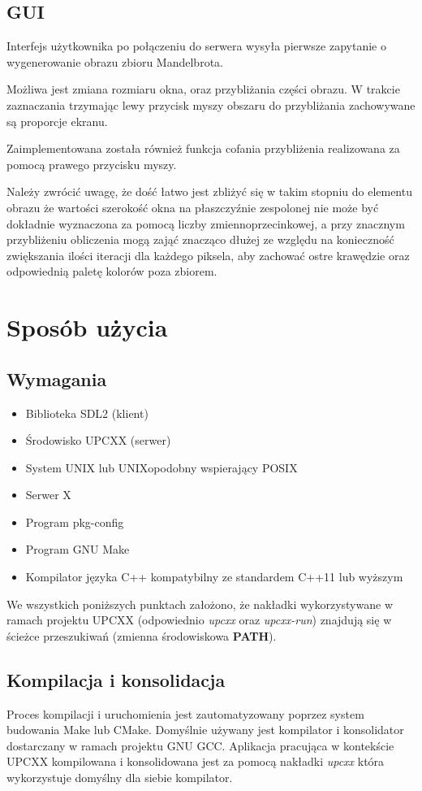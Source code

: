 \subsection{GUI}
Interfejs użytkownika po połączeniu do serwera wysyła pierwsze zapytanie o
wygenerowanie obrazu zbioru Mandelbrota.

Możliwa jest zmiana rozmiaru okna, oraz przybliżania części obrazu. W trakcie
zaznaczania trzymając lewy przycisk myszy obszaru do przybliżania zachowywane są
proporcje ekranu.

Zaimplementowana została również funkcja cofania przybliżenia realizowana za
pomocą prawego przycisku myszy.

Należy zwrócić uwagę, że dość łatwo jest zbliżyć się w takim stopniu do elementu
obrazu że wartości szerokość okna na płaszczyźnie zespolonej nie może być
dokładnie wyznaczona za pomocą liczby zmiennoprzecinkowej, a przy znacznym
przybliżeniu obliczenia mogą zająć znacząco dłużej ze względu na konieczność
zwiększania ilości iteracji dla każdego piksela, aby zachować ostre krawędzie
oraz odpowiednią paletę kolorów poza zbiorem.

\section{Sposób użycia}

\subsection{Wymagania}
\begin{itemize}
    \item Biblioteka SDL2 (klient)
    \item Środowisko UPCXX (serwer)
    \item System UNIX lub UNIXopodobny wspierający POSIX
    \item Serwer X
    \item Program pkg-config
    \item Program GNU Make
    \item Kompilator języka C++ kompatybilny ze standardem C++11 lub wyższym
\end{itemize}

We wszystkich poniższych punktach założono, że nakładki wykorzystywane w ramach
projektu UPCXX (odpowiednio \textit{upcxx} oraz \textit{upcxx-run}) znajdują się
w ścieżce przeszukiwań (zmienna środowiskowa \textbf{PATH}).

\subsection{Kompilacja i konsolidacja}
Proces kompilacji i uruchomienia jest zautomatyzowany poprzez system budowania
Make lub CMake. Domyślnie używany jest kompilator i konsolidator dostarczany w
ramach projektu GNU GCC. Aplikacja pracująca w kontekście UPCXX kompilowana i
konsolidowana jest za pomocą nakładki \textit{upcxx} która wykorzystuje domyślny
dla siebie kompilator.\\

